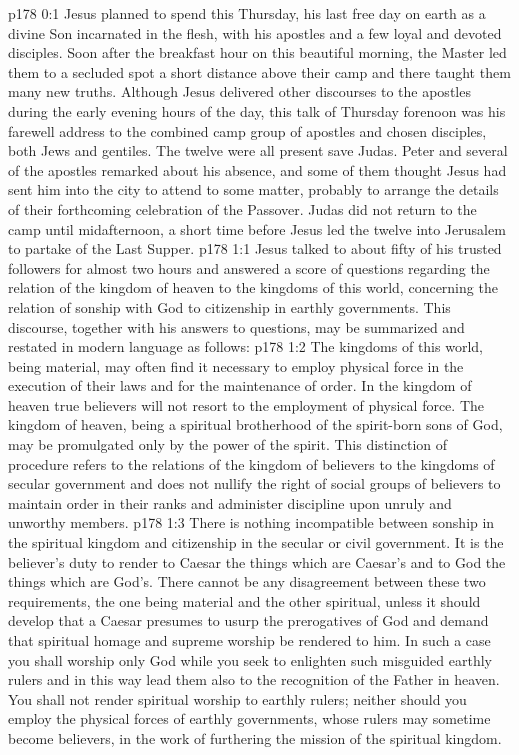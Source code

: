 \author{Midwayer Commission}
\vs p178 0:1 Jesus planned to spend this Thursday, his last free day on earth as a divine Son incarnated in the flesh, with his apostles and a few loyal and devoted disciples. Soon after the breakfast hour on this beautiful morning, the Master led them to a secluded spot a short distance above their camp and there taught them many new truths. Although Jesus delivered other discourses to the apostles during the early evening hours of the day, this talk of Thursday forenoon was his farewell address to the combined camp group of apostles and chosen disciples, both Jews and gentiles. The twelve were all present save Judas. Peter and several of the apostles remarked about his absence, and some of them thought Jesus had sent him into the city to attend to some matter, probably to arrange the details of their forthcoming celebration of the Passover. Judas did not return to the camp until midafternoon, a short time before Jesus led the twelve into Jerusalem to partake of the Last Supper.\plusone
{}
\vs p178 1:1 Jesus talked to about fifty of his trusted followers for almost two hours and answered a score of questions regarding the relation of the kingdom of heaven to the kingdoms of this world, concerning the relation of sonship with God to citizenship in earthly governments. This discourse, together with his answers to questions, may be summarized and restated in modern language as follows:
\pc \vs p178 1:2 The kingdoms of this world, being material, may often find it necessary to employ physical force in the execution of their laws and for the maintenance of order. In the kingdom of heaven true believers will not resort to the employment of physical force. The kingdom of heaven, being a spiritual brotherhood of the spirit\hyp{}born sons of God, may be promulgated only by the power of the spirit. This distinction of procedure refers to the relations of the kingdom of believers to the kingdoms of secular government and does not nullify the right of social groups of believers to maintain order in their ranks and administer discipline upon unruly and unworthy members.
\vs p178 1:3 There is nothing incompatible between sonship in the spiritual kingdom and citizenship in the secular or civil government. It is the believer’s duty to render to Caesar the things which are Caesar’s and to God the things which are God’s. There cannot be any disagreement between these two requirements, the one being material and the other spiritual, unless it should develop that a Caesar presumes to usurp the prerogatives of God and demand that spiritual homage and supreme worship be rendered to him. In such a case you shall worship only God while you seek to enlighten such misguided earthly rulers and in this way lead them also to the recognition of the Father in heaven. You shall not render spiritual worship to earthly rulers; neither should you employ the physical forces of earthly governments, whose rulers may sometime become believers, in the work of furthering the mission of the spiritual kingdom.
